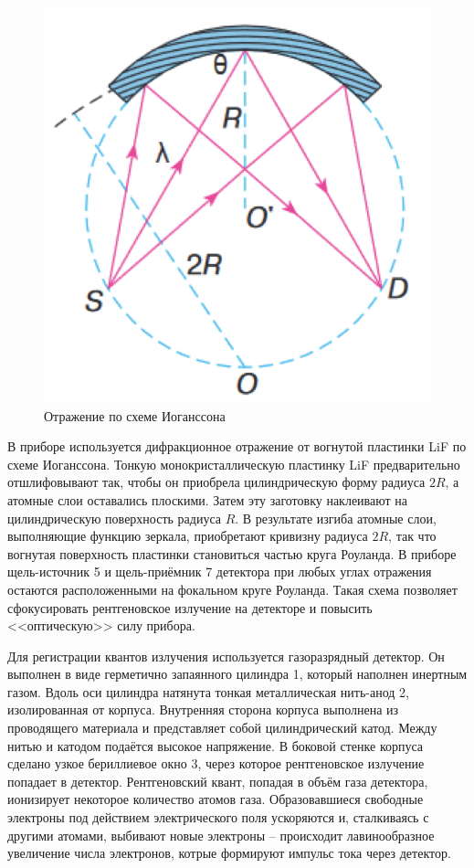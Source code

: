 \documentclass[a4paper, 12pt]{article}%
\begin{document}
		\begin{figure}[h!]
			\centering
			\includegraphics[scale=0.5]{Круг_Роуланда.png}
			\caption{Отражение по схеме Иоганссона}
		\end{figure}				
				
		В приборе используется дифракционное отражение от вогнутой пластинки LiF по схеме Иоганссона. Тонкую монокристаллическую пластинку LiF предварительно отшлифовывают так, чтобы он приобрела цилиндрическую форму радиуса $2R$,  а атомные слои оставались плоскими.  Затем эту заготовку наклеивают на цилиндрическую поверхность радиуса $R$.  В результате изгиба атомные слои,  выполняющие функцию зеркала,  приобретают кривизну радиуса $2R$,  так что вогнутая поверхность пластинки становиться частью круга Роуланда.  В приборе щель-источник 5 и щель-приёмник 7 детектора при любых углах отражения остаются расположенными на фокальном круге Роуланда.  Такая схема позволяет сфокусировать рентгеновское излучение на детекторе и повысить <<оптическую>> силу прибора.	
				
		Для регистрации квантов излучения используется газоразрядный детектор.  Он выполнен в виде герметично запаянного цилиндра 1,  который наполнен инертным газом.  Вдоль оси цилиндра натянута тонкая металлическая нить-анод 2,  изолированная от корпуса.  Внутренняя сторона корпуса выполнена из проводящего материала и представляет собой цилиндрический катод.  Между нитью и катодом подаётся высокое напряжение.  В боковой стенке корпуса сделано узкое бериллиевое окно 3, через которое рентгеновское излучение попадает в детектор.  Рентгеновский квант,  попадая в объём газа детектора, ионизирует некоторое количество атомов газа.  Образовавшиеся свободные электроны под действием электрического поля ускоряются и,  сталкиваясь с другими атомами,  выбивают новые электроны – происходит лавинообразное увеличение числа электронов,  котрые формируют импульс тока через детектор. 
				
\end{document}
